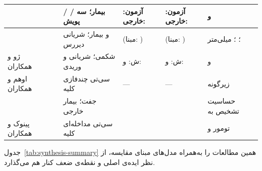 \begin{table}[H]
\begin{tabular}{|R{2.5cm}|R{0.7cm}|R{3.2cm}|R{1.7cm}|R{1.6cm}|R{3.6cm}|}
\hline
{}~\cite{Zhe25} &  &  /  /  بیمار؛ سه پویش & آزمون: \newline خارجی:  & آزمون: \newline خارجی:  &   و  \\
\hline
{}~\cite{Zho24} &  &  و  بیمار؛ شریانی دیررس & \newline (مبنا: ) & \newline (مبنا: ) &  ؛  ؛   میلی‌متر \\
\hline
ژو و همکاران~\cite{Zho23} &  & شکمی؛ شریانی و وریدی & ش: \newline و:  & ش: \newline و:  &   و  \\
\hline
اوهم و همکاران~\cite{Uhm22} &  & سی‌تی چندفازی کلیه & --- & --- &  زیرگونه  \\
\hline
{}~\cite{Han24} &  &  جفت؛  بیمار خارجی &  &  & حساسیت تشخیص  به  \\
\hline
پینوک و همکاران~\cite{Pin23} &  & سی‌تی مداخله‌ای کلیه & \newline {} & \newline {} &  تومور  و  \\
\hline
\end{tabular}
\end{table}

جدول~\ref{tab:synthesis-summary} همین مطالعات را به‌همراه مدل‌های مبنای مقایسه، از نظر ایده‌ی اصلی و نقطه‌ی ضعف کنار هم می‌گذارد.

